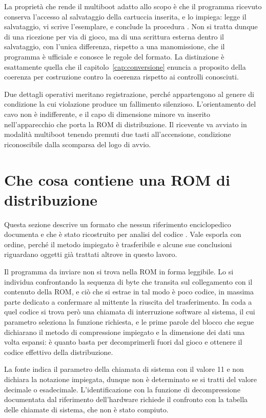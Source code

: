 La proprietà che rende il multiboot adatto allo scopo è che il programma ricevuto conserva l'accesso al salvataggio della cartuccia inserita, e lo impiega: legge il salvataggio, vi scrive l'esemplare, e conclude la procedura \cite{video-distribuzioni}. Non si tratta dunque di una ricezione per via di gioco, ma di una scrittura esterna dentro il salvataggio, con l'unica differenza, rispetto a una manomissione, che il programma è ufficiale e conosce le regole del formato. La distinzione è esattamente quella che il capitolo~\ref{cap:conversione} enuncia a proposito della coerenza per costruzione contro la coerenza rispetto ai controlli conosciuti.

Due dettagli operativi meritano registrazione, perché appartengono al genere di condizione la cui violazione produce un fallimento silenzioso. L'orientamento del cavo non è indifferente, e il capo di dimensione minore va inserito nell'apparecchio che porta la ROM di distribuzione. Il ricevente va avviato in modalità multiboot tenendo premuti due tasti all'accensione, condizione riconoscibile dalla scomparsa del logo di avvio.

\section{Che cosa contiene una ROM di distribuzione}

Questa sezione descrive un formato che nessun riferimento enciclopedico documenta e che è stato ricostruito per analisi del codice \cite{video-distribuzioni}. Vale esporla con ordine, perché il metodo impiegato è trasferibile e alcune sue conclusioni riguardano oggetti già trattati altrove in questo lavoro.

Il programma da inviare non si trova nella ROM in forma leggibile. Lo si individua confrontando la sequenza di byte che transita sul collegamento con il contenuto della ROM, e ciò che si estrae in tal modo è poco codice, in massima parte dedicato a confermare al mittente la riuscita del trasferimento. In coda a quel codice si trova però una chiamata di interruzione software al sistema, il cui parametro seleziona la funzione richiesta, e le prime parole del blocco che segue dichiarano il metodo di compressione impiegato e la dimensione dei dati una volta espansi: è quanto basta per decomprimerli fuori dal gioco e ottenere il codice effettivo della distribuzione.

\begin{daverificare}
La fonte indica il parametro della chiamata di sistema con il valore 11 e non dichiara la notazione impiegata, dunque non è determinato se si tratti del valore decimale o esadecimale. L'identificazione con la funzione di decompressione documentata dal riferimento dell'hardware richiede il confronto con la tabella delle chiamate di sistema, che non è stato compiuto.
\end{daverificare}

